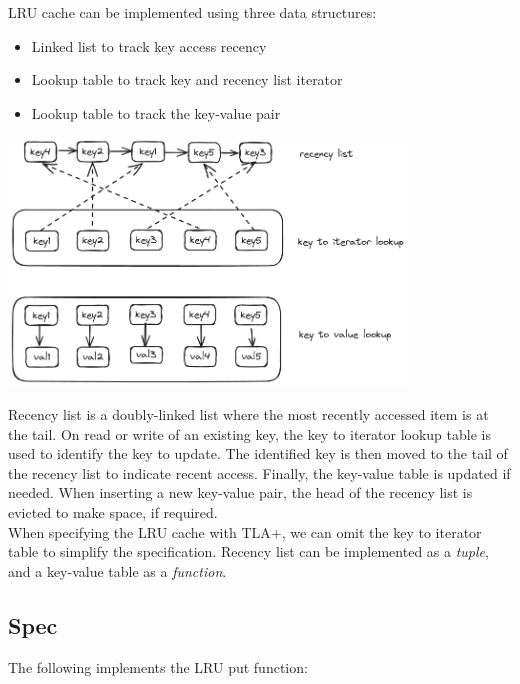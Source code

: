 LRU cache can be implemented using three data structures: 
\begin{itemize}
    \item Linked list to track key access recency 
    \item Lookup table to track key and recency list iterator 
    \item Lookup table to track the key-value pair
\end{itemize}

\begin{center}
\includegraphics[width=300pt]{lru}
\end{center}

Recency list is a doubly-linked list where the most recently accessed item is at
the tail. On read or write of an existing key, the key to iterator lookup table
is used to identify the key to update. The identified key is then moved to the
tail of the recency list to indicate recent access. Finally, the key-value table
is updated if needed. When inserting a new key-value pair, the head of the
recency list is evicted to make space, if required.\\

When specifying the LRU cache with TLA+, we can omit the key to iterator table
to simplify the specification. Recency list can be implemented as a
\textit{tuple}, and a key-value table as a \textit{function}.\\

\subsection{Spec}

The following implements the LRU put function:\\

